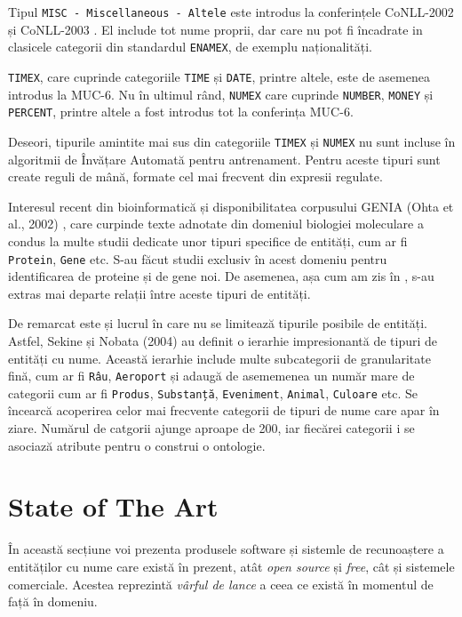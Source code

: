 Tipul \texttt{MISC - Miscellaneous - Altele} este introdus la conferințele CoNLL-2002 și CoNLL-2003 \cite{conll2003}. El include tot nume proprii, dar care nu pot fi încadrate in clasicele categorii din standardul \texttt{ENAMEX}, de exemplu naționalități.

\texttt{TIMEX}, care cuprinde categoriile \texttt{TIME} și \texttt{DATE}, printre altele, este de asemenea introdus la MUC-6. Nu în ultimul rând, \texttt{NUMEX} care cuprinde \texttt{NUMBER}, \texttt{MONEY} și \texttt{PERCENT}, printre altele a fost introdus tot la conferința MUC-6.

Deseori, tipurile amintite mai sus din categoriile \texttt{TIMEX} și \texttt{NUMEX} nu sunt incluse în algoritmii de Învățare Automată pentru antrenament. Pentru aceste tipuri sunt create reguli de mână, formate cel mai frecvent din expresii regulate.


Interesul recent din bioinformatică și disponibilitatea corpusului GENIA (Ohta et al., 2002) \cite{Ohta02thegenia}, care curpinde texte adnotate din domeniul biologiei moleculare a condus la multe studii dedicate unor tipuri specifice de entități, cum ar fi \texttt{Protein}, \texttt{Gene} etc. S-au făcut studii exclusiv în acest domeniu pentru identificarea de proteine și de gene noi. De asemenea, așa cum am zis în , s-au extras mai departe relații între aceste tipuri de entități.


De remarcat este și lucrul în care nu se limitează tipurile posibile de entități. Astfel, Sekine și Nobata (2004) au definit o ierarhie impresionantă de tipuri de entități cu nume. Această ierarhie include multe subcategorii de granularitate fină, cum ar fi \texttt{Râu}, \texttt{Aeroport} și adaugă de asememenea un număr mare de categorii cum ar fi \texttt{Produs}, \texttt{Substanță}, \texttt{Eveniment}, \texttt{Animal}, \texttt{Culoare} etc. Se încearcă acoperirea celor mai frecvente categorii de tipuri de nume care apar în ziare. Numărul de catgorii ajunge aproape de 200, iar fiecărei categorii i se asociază atribute pentru o construi o ontologie. \cite{sekine2004}

\section{State of The Art}

În această secțiune voi prezenta produsele software și sistemle de recunoaștere a entităților cu nume care există în prezent, atât \textit{open source} și \textit{free}, cât și sistemele comerciale. Acestea reprezintă \textit{vârful de lance} a ceea ce există în momentul de față în domeniu. 

